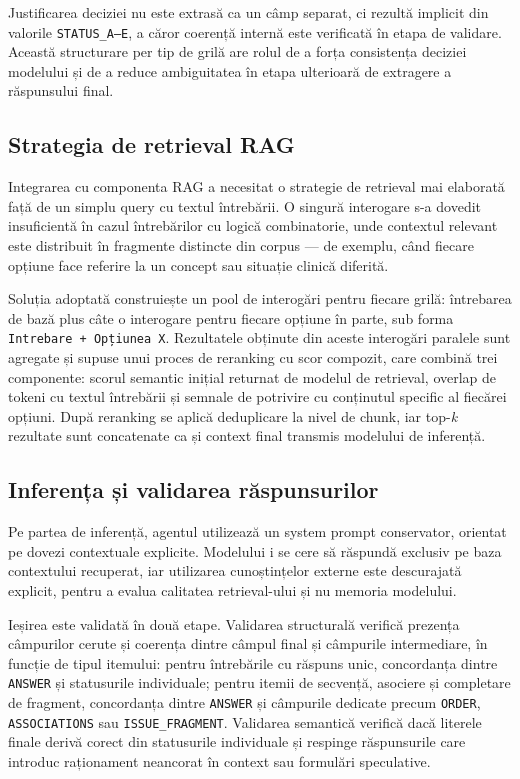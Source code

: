 \documentclass[12pt, a4paper, oneside, romanian]{teza-upb}
\begin{document}
Justificarea deciziei nu este extrasă ca un câmp separat, ci rezultă implicit din valorile \texttt{STATUS\_A--E}, a căror coerență internă este verificată în etapa de validare. Această structurare per tip de grilă are rolul de a forța consistența deciziei modelului și de a reduce ambiguitatea în etapa ulterioară de extragere a răspunsului final.
\subsection{Strategia de retrieval RAG}

Integrarea cu componenta RAG a necesitat o strategie de retrieval mai elaborată față de un simplu query cu textul întrebării. O singură interogare s-a dovedit insuficientă în cazul întrebărilor cu logică combinatorie, unde contextul relevant este distribuit în fragmente distincte din corpus --- de exemplu, când fiecare opțiune face referire la un concept sau situație clinică diferită.

Soluția adoptată construiește un pool de interogări pentru fiecare grilă: întrebarea de bază plus câte o interogare pentru fiecare opțiune în parte, sub forma \texttt{Intrebare + Opțiunea X}. Rezultatele obținute din aceste interogări paralele sunt agregate și supuse unui proces de reranking cu scor compozit, care combină trei componente: scorul semantic inițial returnat de modelul de retrieval, overlap de tokeni cu textul întrebării și semnale de potrivire cu conținutul specific al fiecărei opțiuni. După reranking se aplică deduplicare la nivel de chunk, iar top-\textit{k} rezultate sunt concatenate ca și context final transmis modelului de inferență.

\subsection{Inferența și validarea răspunsurilor}

Pe partea de inferență, agentul utilizează un system prompt conservator, orientat pe dovezi contextuale explicite. Modelului i se cere să răspundă exclusiv pe baza contextului recuperat, iar utilizarea cunoștințelor externe este descurajată explicit, pentru a evalua calitatea retrieval-ului și nu memoria modelului.

Ieșirea este validată în două etape. Validarea structurală verifică prezența câmpurilor cerute și coerența dintre câmpul final și câmpurile intermediare, în funcție de tipul itemului: pentru întrebările cu răspuns unic, concordanța dintre \texttt{ANSWER} și statusurile individuale; pentru itemii de secvență, asociere și completare de fragment, concordanța dintre \texttt{ANSWER} și câmpurile dedicate precum \texttt{ORDER}, \texttt{ASSOCIATIONS} sau \texttt{ISSUE\_FRAGMENT}. Validarea semantică verifică dacă literele finale derivă corect din statusurile individuale și respinge răspunsurile care introduc raționament neancorat în context sau formulări speculative.
\end{document}

